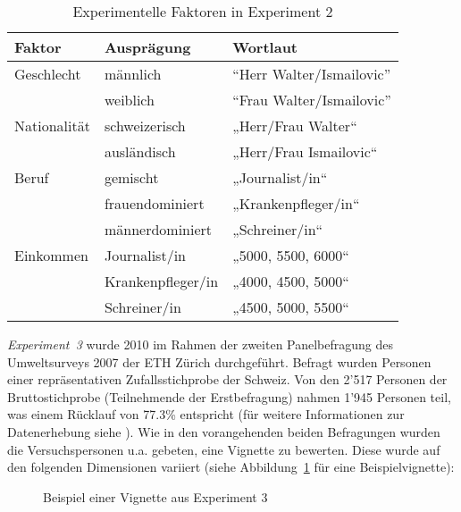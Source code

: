 \documentclass[a4paper,12pt]{article}
\renewcommand{\baselinestretch}{1.1}
\newif\ifcomments
\newcommand{\comment}[1]{%
    \ifcomments\marginpar{\renewcommand{\baselinestretch}{1}\tiny\hspace*{-1.1em}\colorbox{gray!20}%
    {\textcolor{red}{\parbox[t]{.9in}{\raggedright #1}}}}\fi}
\begin{document}
\begin{table}
    \small
    \caption{Experimentelle Faktoren in Experiment 2}\label{tab-ex2-faktoren}
    \begin{tabularx}{\textwidth}{@{}llX@{}}
        \toprule
        Faktor          & Ausprägung & Wortlaut       \\\midrule
        Geschlecht      & männlich     & “Herr Walter/Ismailovic”   \\
                        & weiblich     & “Frau Walter/Ismailovic”   \\
        \addlinespace
        Nationalität   & schweizerisch         & „Herr/Frau Walter“ \\
                        & ausländisch         & „Herr/Frau Ismailovic“ \\
        \addlinespace
        Beruf        & gemischt         & „Journalist/in“   \\
                        & frauendominiert         & „Krankenpfleger/in“  \\
				& männerdominiert         & „Schreiner/in“  \\
	  \addlinespace
        Einkommen        & Journalist/in         & „5000, 5500, 6000“   \\
					& Krankenpfleger/in & „4000, 4500, 5000“   \\
					& Schreiner/in & „4500, 5000, 5500“   \\
        \bottomrule
    \end{tabularx}
\end{table}

\emph{Experiment~3} wurde 2010 im Rahmen der zweiten Panelbefragung des Umweltsurveys
2007 der ETH Zürich durchgeführt. Befragt wurden Personen einer repräsentativen
Zufallsstichprobe der Schweiz. Von den 2'517 Personen der Bruttostichprobe
(Teilnehmende der Erstbefragung) nahmen 1'945 Personen teil, was einem Rücklauf
von 77.3\% entspricht (für weitere Informationen zur Datenerhebung siehe
\citealp{Diekmann-etal-2012}). Wie in den vorangehenden beiden Befragungen
wurden die Versuchspersonen u.a. gebeten, eine Vignette zu bewerten. Diese wurde
auf den folgenden Dimensionen variiert (siehe Abbildung~\ref{fig-3} für eine Beispielvignette):
\comment{Tabelle zu Faktoren wie bei Experiment 1 -> ok, noch schöner machen}


\begin{figure}\centering
    \caption{Beispiel einer Vignette aus Experiment 3}\label{fig-3}
\end{figure}
\end{document}

